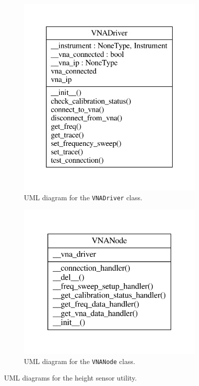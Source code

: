 \documentclass{article}
\begin{document}
\begin{figure}[H]
    \begin{subfigure}{0.5\textwidth}
        \centering
        \includegraphics{images/UML/vna_acquisition/vna_driver.pdf}
        \caption{UML diagram for the \texttt{VNADriver} class.}
        \label{fig:acquisition_uml_driver}
    \end{subfigure}
    \begin{subfigure}{0.5\textwidth}
        \centering
        \includegraphics{images/UML/vna_acquisition/vna_node.pdf}
        \caption{UML diagram for the \texttt{VNANode} class.}
        \label{fig:acquisition_uml_node}
    \end{subfigure}
    \caption{UML diagrams for the height sensor utility.}
    \label{fig:acquisition_uml}
\end{figure}
\end{document}
